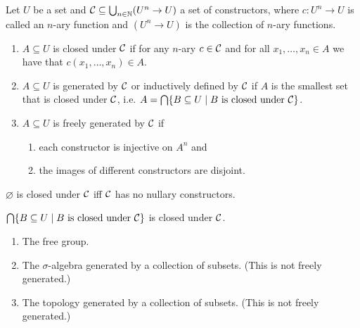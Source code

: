 \begin{boxdef}
\begin{defi}
    Let $U$ be a set and $\mathcal{C} \subseteq \bigcup_{n \in \mathbb{N}} (U^n \to U)$ a set of \alert{constructors},
    where $c \colon U^n \to U$ is called an \alert{$n$-ary function} and $(U^n \to U)$ is the collection of $n$-ary functions.
    \begin{enumerate}
        \item $A \subseteq U$ is \alert{closed under $\mathcal{C}$} if for any $n$-ary $c \in \mathcal{C}$ and for all $x_1, \dots , x_n \in A$ we have that $c(x_1, \dots, x_n) \in A$.
        \item $A \subseteq U$ is  \alert{generated by $\mathcal{C}$} or \alert{inductively defined by $\mathcal{C}$} if $A$ is the smallest set that is closed under $\mathcal{C}$, i.e. $A = \bigcap \{B \subseteq U \mid B \text{ is closed under } \mathcal{C}\}$.
        \item $A \subseteq U$ is \alert{freely generated by $\mathcal{C}$} if 
            \begin{enumerate}
                \item each constructor is injective on $A^n$ and
                \item the images of different constructors are disjoint.
            \end{enumerate}
    \end{enumerate}
\end{defi}
\end{boxdef}

\begin{rem}
$\varnothing$ is closed under $\mathcal{C}$ iff $\mathcal{C}$ has no nullary constructors.
\end{rem}

\begin{exercise}
    $\bigcap \{B \subseteq U \mid B \text{\textup{ is closed under }} \mathcal{C}\}$ is closed under $\mathcal{C}$.
\end{exercise}

\begin{example}
    \hfill
    \begin{enumerate}
        \item The free group.
        \item The $\sigma$-algebra generated by a collection of subsets. (This is not freely generated.)
        \item The topology generated by a collection of subsets. (This is not freely generated.)
    \end{enumerate}
\end{example}

